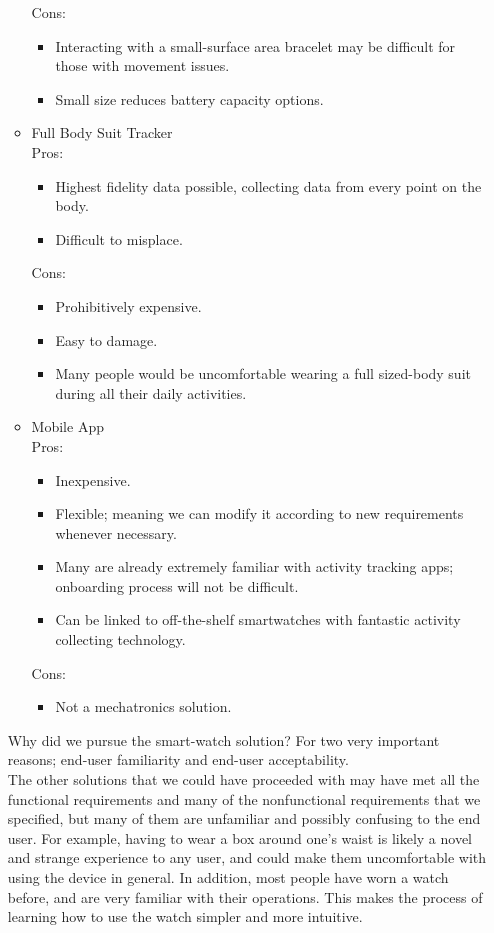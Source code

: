 \documentclass[12pt, titlepage]{article}
\begin{document}
\begin{enumerate}
\begin{itemize}
	Cons:
	\begin{itemize}
		\item Interacting with a small-surface area bracelet may be difficult for those with movement issues.
		\item Small size reduces battery capacity options.
	\end{itemize}
\item Full Body Suit Tracker\\
	Pros:
	\begin{itemize}
		\item Highest fidelity data possible, collecting data from every point on the body.
		\item Difficult to misplace.
	\end{itemize}
	Cons:
	\begin{itemize}
		\item Prohibitively expensive.
		\item Easy to damage.
		\item Many people would be uncomfortable wearing a full sized-body suit during all their daily activities.
	\end{itemize}
\item Mobile App \\
	Pros:
	\begin{itemize}
		\item Inexpensive.
		\item Flexible; meaning we can modify it according to new requirements whenever necessary.
		\item Many are already extremely familiar with activity tracking apps; onboarding process will not be difficult.
		\item Can be linked to off-the-shelf smartwatches with fantastic activity collecting technology.
	\end{itemize}
	Cons:
	\begin{itemize}
		\item Not a mechatronics solution.
	\end{itemize}
\end{itemize}
Why did we pursue the smart-watch solution? For two very important reasons; end-user familiarity and end-user acceptability.\\

The other solutions that we could have proceeded with may have met all the functional requirements and many of the nonfunctional requirements that we specified, but many of them are unfamiliar and possibly confusing to the end user. For example, having to wear a box around one's waist is likely a novel and strange experience to any user, and could make them uncomfortable with using the device in general. In addition, most people have worn a watch before, and are very familiar with their operations. This makes the process of learning how to use the watch simpler and more intuitive.\\


\end{enumerate}
\end{document}
